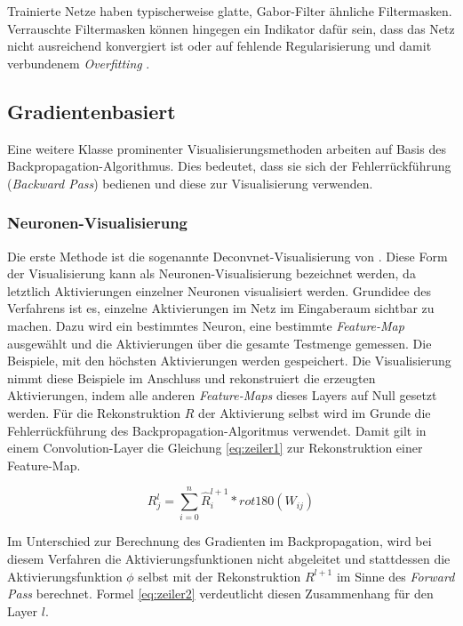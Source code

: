 Trainierte Netze haben typischerweise glatte, Gabor-Filter ähnliche Filtermasken. Verrauschte Filtermasken können hingegen ein Indikator dafür sein, dass das Netz nicht ausreichend konvergiert ist oder auf fehlende Regularisierung und damit verbundenem \textit{Overfitting} \cite[vgl.][]{Kaparthy2014}.     


\subsection{Gradientenbasiert}

Eine weitere Klasse prominenter Visualisierungsmethoden arbeiten auf Basis des Backpropagation-Algorithmus. Dies bedeutet, dass sie sich der Fehlerrückführung (\textit{Backward Pass}) bedienen und diese zur Visualisierung verwenden.

\subsubsection{Neuronen-Visualisierung}
Die erste Methode ist die sogenannte Deconvnet-Visualisierung von \cite{Zeiler2014}. Diese Form der Visualisierung kann als Neuronen-Visualisierung bezeichnet werden, da letztlich Aktivierungen einzelner Neuronen visualisiert werden. Grundidee des Verfahrens ist es, einzelne Aktivierungen im Netz im Eingaberaum sichtbar zu machen. Dazu wird ein bestimmtes Neuron, eine bestimmte \textit{Feature-Map} ausgewählt und die Aktivierungen über die gesamte Testmenge gemessen. Die Beispiele, mit den höchsten Aktivierungen werden gespeichert. Die Visualisierung nimmt diese Beispiele im Anschluss und rekonstruiert die erzeugten Aktivierungen, indem alle anderen \textit{Feature-Maps} dieses Layers auf Null gesetzt werden. Für die Rekonstruktion $R$ der Aktivierung selbst wird im Grunde die Fehlerrückführung des Backpropagation-Algoritmus verwendet. Damit gilt in einem Convolution-Layer die Gleichung \ref{eq:zeiler1} zur Rekonstruktion einer Feature-Map.

\begin{equation}
\label{eq:zeiler1}
R^l_j = \sum_{i = 0}^{n} \hat{R}^{l+1}_{i} \ast rot180(W_{ij})
\end{equation}

Im Unterschied zur Berechnung des Gradienten im Backpropagation, wird bei diesem Verfahren die Aktivierungsfunktionen nicht abgeleitet und stattdessen die Aktivierungsfunktion $\phi$ selbst mit der Rekonstruktion $R^{l+1}$ im Sinne des \textit{Forward Pass} berechnet. Formel \ref{eq:zeiler2} verdeutlicht diesen Zusammenhang für den Layer $l$.

